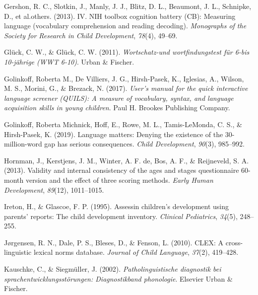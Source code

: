 \documentclass[
  man,floatsintext]{apa6}
\newlength{\cslhangindent}
\newlength{\cslentryspacingunit} %
\newenvironment{CSLReferences}[2] %
 {%
  \setlength{\parindent}{0pt}
  \ifodd #1
  \let\oldpar\par
  \def\par{\hangindent=\cslhangindent\oldpar}
  \fi
  \setlength{\parskip}{#2\cslentryspacingunit}
 }%
 {}
\begin{document}
\begin{CSLReferences}{1}{0}
\leavevmode{}%
Gershon, R. C., Slotkin, J., Manly, J. J., Blitz, D. L., Beaumont, J. L., Schnipke, D., et al.others. (2013). IV. NIH toolbox cognition battery (CB): Measuring language (vocabulary comprehension and reading decoding). \emph{Monographs of the Society for Research in Child Development}, \emph{78}(4), 49--69.

\leavevmode{}%
Glück, C. W., \& Glück, C. W. (2011). \emph{Wortschatz-und wortfindungstest f{ü}r 6-bis 10-j{ä}hrige (WWT 6-10)}. Urban \& Fischer.

\leavevmode{}%
Golinkoff, Roberta M., De Villiers, J. G., Hirsh-Pasek, K., Iglesias, A., Wilson, M. S., Morini, G., \& Brezack, N. (2017). \emph{User's manual for the quick interactive language screener (QUILS): A measure of vocabulary, syntax, and language acquisition skills in young children}. Paul H. Brookes Publishing Company.

\leavevmode{}%
Golinkoff, Roberta Michnick, Hoff, E., Rowe, M. L., Tamis-LeMonda, C. S., \& Hirsh-Pasek, K. (2019). Language matters: Denying the existence of the 30-million-word gap has serious consequences. \emph{Child Development}, \emph{90}(3), 985--992.

\leavevmode{}%
Hornman, J., Kerstjens, J. M., Winter, A. F. de, Bos, A. F., \& Reijneveld, S. A. (2013). Validity and internal consistency of the ages and stages questionnaire 60-month version and the effect of three scoring methods. \emph{Early Human Development}, \emph{89}(12), 1011--1015.

\leavevmode{}%
Ireton, H., \& Glascoe, F. P. (1995). Assessin children's development using parents' reports: The child development inventory. \emph{Clinical Pediatrics}, \emph{34}(5), 248--255.

\leavevmode{}%
Jørgensen, R. N., Dale, P. S., Bleses, D., \& Fenson, L. (2010). CLEX: A cross-linguistic lexical norms database. \emph{Journal of Child Language}, \emph{37}(2), 419--428.

\leavevmode{}%
Kauschke, C., \& Siegmüller, J. (2002). \emph{Patholinguistische diagnostik bei sprachentwicklungsst{ö}rungen: Diagnostikband phonologie}. Elsevier Urban \& Fischer.


\end{CSLReferences}
\end{document}
